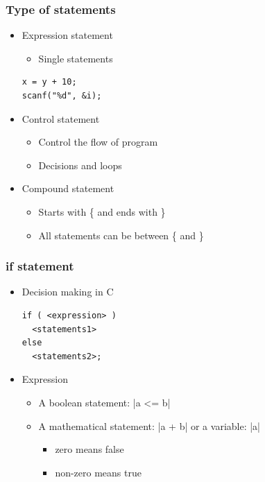 \documentclass{../c-lecture}
\begin{document}
\begin{frame}[fragile]
  \frametitle{Type of statements}
  \begin{itemize}
    \item Expression statement
    \begin{itemize}
      \item Single statements
    \end{itemize}
    \begin{verbatim}
x = y + 10;
scanf("%d", &i);
    \end{verbatim}
    \item Control statement
    \begin{itemize}
      \item Control the flow of program
      \item Decisions and loops
    \end{itemize}
    \item Compound statement
    \begin{itemize}
      \item Starts with \{ and ends with \}
      \item All statements can be between \{ and \}
    \end{itemize}
  \end{itemize}
\end{frame}

\begin{frame}[fragile]
  \frametitle{if statement}
  \begin{itemize}
    \item Decision making in C
    \begin{verbatim}
if ( <expression> )
  <statements1>
else
  <statements2>;
    \end{verbatim}
    \item Expression
    \begin{itemize}
      \item A boolean statement: |a <= b|
      \item
        A mathematical statement: |a + b| or a variable: |a|
      \begin{itemize}
        \item zero means false
        \item non-zero means true
      \end{itemize}
    \end{itemize}
  \end{itemize}
\end{frame}
\end{document}
